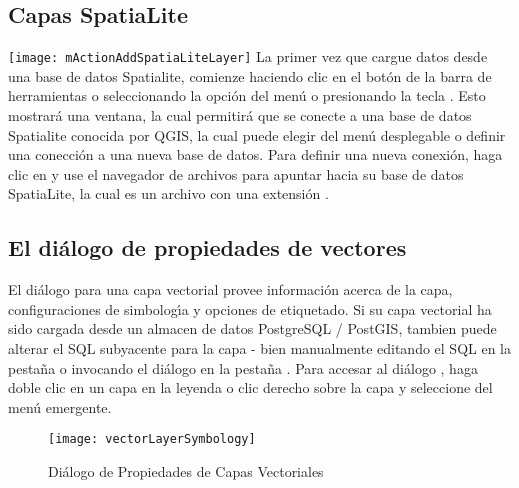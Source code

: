 \subsection{Capas SpatiaLite} 
\label{label_spatialite} 

\texttt{[image: mActionAddSpatiaLiteLayer]}
La primer vez que cargue datos desde una base de datos Spatialite, comienze haciendo clic en el bot\'on de la barra
de herramientas  o seleccionando la opci\'on  
del men\'u  o presionando la tecla . 
Esto mostrar\'a una ventana, la cual permitir\'a que se conecte a una base de datos Spatialite conocida por QGIS, la cual 
puede elegir del men\'u desplegable o definir una conecci\'on a una nueva base de datos. Para definir una nueva conexi\'on, haga clic en  y use el navegador de archivos para apuntar hacia su base de datos SpatiaLite, 
la cual es un archivo con una extensi\'on .

\subsection{El di\'alogo de propiedades de vectores}\label{sec:vectorprops}

El di\'alogo  para una capa vectorial 
provee informaci\'on acerca de la capa, configuraciones
de simbolog\'{\i}a y opciones de etiquetado. Si su capa vectorial ha sido cargada desde
un almacen de datos PostgreSQL / PostGIS, tambien puede alterar el SQL subyacente para la
capa - bien manualmente editando el SQL en la pesta\~na  o invocando
el di\'alogo  en la pesta\~na . 
Para accesar al di\'alogo
, haga doble clic en un capa en la leyenda o clic derecho sobre
la capa y seleccione  del men\'u emergente.

\begin{figure}[H]
   \begin{center}
   \caption{Di\'alogo de Propiedades de Capas Vectoriales \nixcaption}\label{fig:vector_symbology}\smallskip
   \texttt{[image: vectorLayerSymbology]} 
\end{center}  
\end{figure}

